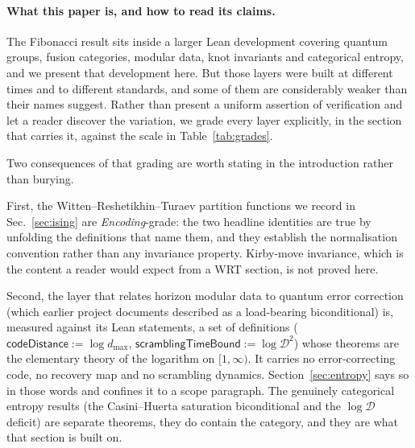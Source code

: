 \documentclass[aps,prx,nofootinbib,superscriptaddress,12pt]{revtex4-2}
\begin{document}
\paragraph{What this paper is, and how to read its claims.}
The Fibonacci result sits inside a larger Lean development covering
quantum groups, fusion categories, modular data, knot invariants and
categorical entropy, and we present that development here. But those
layers were built at different times and to different standards, and
some of them are considerably weaker than their names suggest. Rather
than present a uniform assertion of verification and let a reader
discover the variation, we grade every layer explicitly, in the section
that carries it, against the scale in Table~\ref{tab:grades}.

\begin{table}[t]
\caption{Strength grading used throughout. Every section states the
grade of its own results. \emph{Kernel-checked} means the Lean~4 kernel
verified the proof term against the ambient axioms
$\{\texttt{propext}, \texttt{Classical.choice}, \texttt{Quot.sound}\}$;
\emph{evaluation-checked} means the proof invokes \texttt{native\_decide},
which delegates a decidable computation to compiled code and adds a
per-theorem axiom (Sec.~\ref{sec:ising}, Sec.~\ref{sec:trust}).}
\label{tab:grades}
\begin{ruledtabular}

\end{ruledtabular}
\end{table}

Two consequences of that grading are worth stating in the introduction
rather than burying.

First, the Witten--Reshetikhin--Turaev partition functions we record in
Sec.~\ref{sec:ising} are \emph{Encoding}-grade: the two headline
identities are true by unfolding the definitions that name them, and
they establish the normalisation convention rather than any invariance
property. Kirby-move invariance, which is the content a reader would
expect from a WRT section, is not proved here.

Second, the layer that relates horizon modular data to quantum error
correction (which earlier project documents described as a
load-bearing biconditional) is, measured against its Lean statements,
a set of definitions ($\textsf{codeDistance} := \log d_{\max}$,
$\textsf{scramblingTimeBound} := \log \mathcal{D}^2$) whose theorems are
the elementary theory of the logarithm on $[1,\infty)$. It carries no
error-correcting code, no recovery map and no scrambling dynamics.
Section~\ref{sec:entropy} says so in those words and confines it to a
scope paragraph. The genuinely categorical entropy results (the
Casini--Huerta saturation biconditional and the $\log\mathcal{D}$
deficit) are separate theorems, they do contain the category, and
they are what that section is built on.
\end{document}

